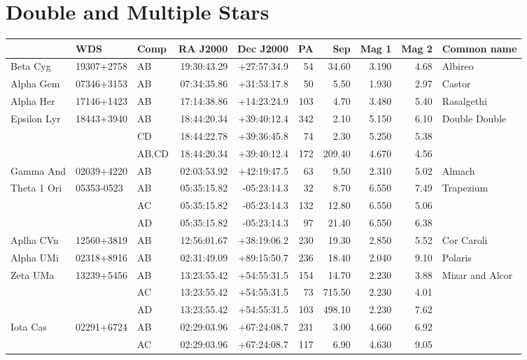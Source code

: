 \documentclass[11pt]{article}
\begin{document}
\section*{Double and Multiple Stars}

\begin{longtable}{lllrrrrrrl}
  \toprule
              & WDS        & Comp  & RA J2000    & Dec J2000   & PA  & Sep    & Mag 1 & Mag 2 & Common name     \\
  \midrule \endhead
  Beta Cyg    & 19307+2758 & AB    & 19:30:43.29 & +27:57:34.9 & 54  & 34.60  & 3.190 & 4.68  & Albireo         \\[1.5ex]
  Alpha Gem   & 07346+3153 & AB    & 07:34:35.86 & +31:53:17.8 & 50  & 5.50   & 1.930 & 2.97  & Castor          \\[1.5ex]
  Alpha Her   & 17146+1423 & AB    & 17:14:38.86 & +14:23:24.9 & 103 & 4.70   & 3.480 & 5.40  & Rasalgethi      \\[1.5ex]
  Epsilon Lyr & 18443+3940 & AB    & 18:44:20.34 & +39:40:12.4 & 342 & 2.10   & 5.150 & 6.10  & Double Double   \\
              &            & CD    & 18:44:22.78 & +39:36:45.8 & 74  & 2.30   & 5.250 & 5.38                    \\
              &            & AB,CD & 18:44:20.34 & +39:40:12.4 & 172 & 209.40 & 4.670 & 4.56                    \\[1.5ex]
  Gamma And   & 02039+4220 & AB    & 02:03:53.92 & +42:19:47.5 & 63  & 9.50   & 2.310 & 5.02  & Almach          \\[1.5ex]
  Theta 1 Ori & 05353-0523 & AB    & 05:35:15.82 & -05:23:14.3 & 32  & 8.70   & 6.550 & 7.49  & Trapezium       \\
              &            & AC    & 05:35:15.82 & -05:23:14.3 & 132 & 12.80  & 6.550 & 5.06                    \\
              &            & AD    & 05:35:15.82 & -05:23:14.3 & 97  & 21.40  & 6.550 & 6.38                    \\[1.5ex]
  Aplha CVn   & 12560+3819 & AB    & 12:56:01.67 & +38:19:06.2 & 230 & 19.30  & 2.850 & 5.52  & Cor Caroli      \\[1.5ex]
  Alpha UMi   & 02318+8916 & AB    & 02:31:49.09 & +89:15:50.7 & 236 & 18.40  & 2.040 & 9.10  & Polaris         \\[1.5ex]
  Zeta UMa    & 13239+5456 & AB    & 13:23:55.42 & +54:55:31.5 & 154 & 14.70  & 2.230 & 3.88  & Mizar and Alcor \\
              &            & AC    & 13:23:55.42 & +54:55:31.5 & 73  & 715.50 & 2.230 & 4.01  &                 \\
              &            & AD    & 13:23:55.42 & +54:55:31.5 & 103 & 498.10 & 2.230 & 7.62  &                 \\[1.5ex]
  Iota Cas    & 02291+6724 & AB    & 02:29:03.96 & +67:24:08.7 & 231 & 3.00   & 4.660 & 6.92  &                 \\
              &            & AC    & 02:29:03.96 & +67:24:08.7 & 117 & 6.90   & 4.630 & 9.05  &                 \\
  \bottomrule
\end{longtable}



\end{document}
